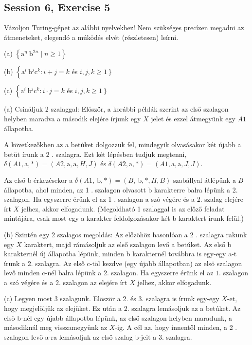 \subsection{Session 6, Exercise 5}


Vázoljon Turing-gépet az alábbi nyelvekhez! Nem szükséges precízen megadni az átmeneteket, elegendó a múködés elvét (részletesen) leírni.

(a) $\left\{\mathrm{a}^{n} \mathrm{~b}^{2 n} \mid n \geq 1\right\}$

(b) $\left\{\mathrm{a}^{i} \mathrm{~b}^{j} \mathrm{c}^{k}: i+j=k\right.$ és $\left.i, j, k \geq 1\right\}$

(c) $\left\{\mathrm{a}^{i} \mathrm{~b}^{j} \mathrm{c}^{k}: i \cdot j=k\right.$ és $\left.i, j, k \geq 1\right\}$


(a) Csináljuk 2 szalaggal: Elóször, a korábbi példák szerint az első szalagon helyben maradva a második elejére írjunk egy $X$ jelet és ezzel átmegyünk egy $A 1$ állapotba.

A következőkben az a betúket dolgozzuk fel, mindegyik olvasásakor két újabb a betüt írunk a 2 . szalagra. Ezt két lépésben tudjuk megtenni, $\delta(A 1, \mathrm{a}, *)=(A 2, \mathrm{a}, \mathrm{a}, H, J)$ és $\delta(A 2, \mathrm{a}, *)=(A 1, \mathrm{a}, \mathrm{a}, J, J)$.

Az első b érkezésekor a $\delta(A 1, \mathrm{~b}, *)=(B, \mathrm{~b}, *, H, B)$ szabállyal átlépünk a $B$ állapotba, ahol minden, az 1 . szalagon olvasott b karakterre balra lépünk a 2. szalagon. Ha egyszerre érünk el az 1 . szalagon a szó végére és a 2. szalag elejére írt $X$ jelhez, akkor elfogadunk. (Megoldható 1 szalaggal is az előző feladat mintájára, csak most egy a karakter feldolgozásakor két b karaktert írunk felül.)

(b) Szintén egy 2 szalagos megoldás: Az előzöhöz hasonlóan a 2 . szalagra rakunk egy $X$ karaktert, majd rámásoljuk az első szalagon levő a betúket. Az első b karakternél új állapotba lépünk, minden b karakternél továbbra is egy-egy a-t írunk a 2. szalagra. Az első c-töl kezdve (egy újabb állapotban) az elsö szalagon levő minden c-nél balra lépünk a 2. szalagon. Ha egyszerre érünk el az $1 .$ szalagon a szó végére és a $2 .$ szalagon az elejére írt $X$ jelhez, akkor elfogadunk.

(c) Legyen most 3 szalagunk. Elöször a 2. és 3. szalagra is írunk egy-egy $X$-et, hogy megjelöljük az elejüket. Ez után a 2. szalagra lemásoljuk az a betúket. Az első b-nél egy újabb állapotba lépünk, az elsö szalagon helyben maradunk, a másodiknál meg visszamegyünk az $X$-ig. A cél az, hogy innentől minden, a 2 . szalagon levő a-ra lemásoljuk az első szalag b-jeit a 3. szalagra.

